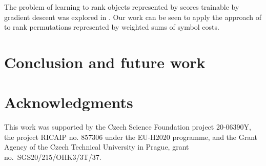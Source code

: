 \documentclass[runningheads]{llncs}
\begin{document}
The problem of learning to rank objects represented by scores trainable by gradient descent was explored in \cite{Burges2005}.
Our work can be seen to apply the approach of \cite{Burges2005} to rank permutations represented by weighted sums of symbol costs.



\section{Conclusion and future work}
\label{sec:conclusion}


\section*{Acknowledgments}



This work was supported by
the Czech Science Foundation project 20-06390Y,
the project RICAIP no. 857306 under the EU-H2020 programme,
and
the Grant Agency of the Czech Technical University in Prague, grant\\
no.~SGS20/215/OHK3/3T/37.





%
\end{document}
